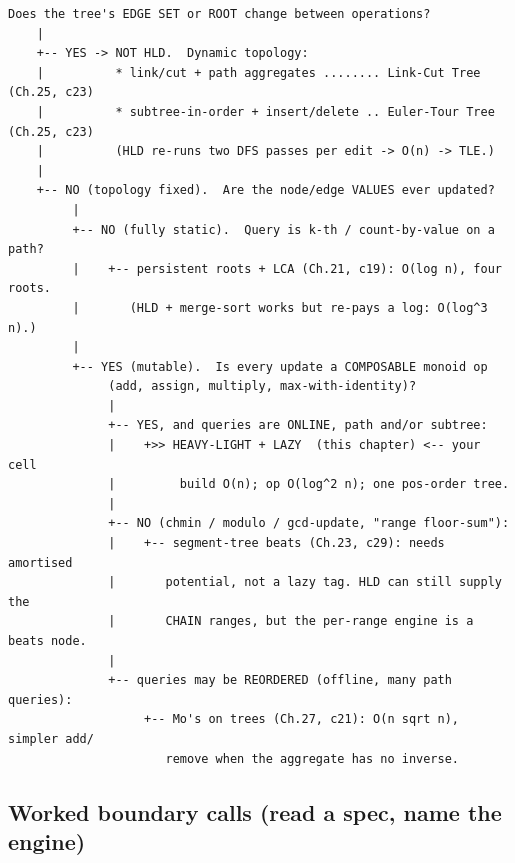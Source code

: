 \begin{lstlisting}[language={}, basicstyle=\ttfamily\small, numbers=none, frame=single,
  caption={Decision ladder: read top to bottom, stop at the first line that matches the specification. Hands off everything HLD does not own.}, label={lst:c16-map}]
  Does the tree's EDGE SET or ROOT change between operations?
    |
    +-- YES -> NOT HLD.  Dynamic topology:
    |          * link/cut + path aggregates ........ Link-Cut Tree  (Ch.25, c23)
    |          * subtree-in-order + insert/delete .. Euler-Tour Tree (Ch.25, c23)
    |          (HLD re-runs two DFS passes per edit -> O(n) -> TLE.)
    |
    +-- NO (topology fixed).  Are the node/edge VALUES ever updated?
         |
         +-- NO (fully static).  Query is k-th / count-by-value on a path?
         |    +-- persistent roots + LCA (Ch.21, c19): O(log n), four roots.
         |       (HLD + merge-sort works but re-pays a log: O(log^3 n).)
         |
         +-- YES (mutable).  Is every update a COMPOSABLE monoid op
              (add, assign, multiply, max-with-identity)?
              |
              +-- YES, and queries are ONLINE, path and/or subtree:
              |    +>> HEAVY-LIGHT + LAZY  (this chapter) <-- your cell
              |         build O(n); op O(log^2 n); one pos-order tree.
              |
              +-- NO (chmin / modulo / gcd-update, "range floor-sum"):
              |    +-- segment-tree beats (Ch.23, c29): needs amortised
              |       potential, not a lazy tag. HLD can still supply the
              |       CHAIN ranges, but the per-range engine is a beats node.
              |
              +-- queries may be REORDERED (offline, many path queries):
                   +-- Mo's on trees (Ch.27, c21): O(n sqrt n), simpler add/
                      remove when the aggregate has no inverse.
\end{lstlisting}

\subsection{Worked boundary calls (read a spec, name the engine)}


